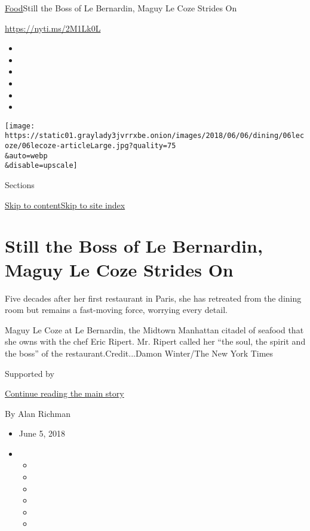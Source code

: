 \href{/section/food}{Food}\textbar{}Still the Boss of Le Bernardin,
Maguy Le Coze Strides On

\url{https://nyti.ms/2M1Lk0L}

\begin{itemize}
\item
\item
\item
\item
\item
\item
\end{itemize}

\texttt{[image: https://static01.graylady3jvrrxbe.onion/images/2018/06/06/dining/06lecoze/06lecoze-articleLarge.jpg?quality=75\\\&auto=webp\\\&disable=upscale]}

Sections

\protect\hyperlink{site-content}{Skip to
content}\protect\hyperlink{site-index}{Skip to site index}

\hypertarget{still-the-boss-of-le-bernardin-maguy-le-coze-strides-on}{%
\section{Still the Boss of Le Bernardin, Maguy Le Coze Strides
On}\label{still-the-boss-of-le-bernardin-maguy-le-coze-strides-on}}

Five decades after her first restaurant in Paris, she has retreated from
the dining room but remains a fast-moving force, worrying every detail.

Maguy Le Coze at Le Bernardin, the Midtown Manhattan citadel of seafood
that she owns with the chef Eric Ripert. Mr. Ripert called her ``the
soul, the spirit and the boss'' of the restaurant.Credit...Damon
Winter/The New York Times

Supported by

\protect\hyperlink{after-sponsor}{Continue reading the main story}

By Alan Richman

\begin{itemize}
\item
  June 5, 2018
\item
  \begin{itemize}
  \item
  \item
  \item
  \item
  \item
  \item
  \end{itemize}
\end{itemize}

